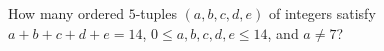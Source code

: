 How many ordered $5$-tuples $(a,b,c,d,e)$ of integers satisfy $a+b+c+d+e=14$, $0\le a,b,c,d,e\le14$, and $a\ne7$?
